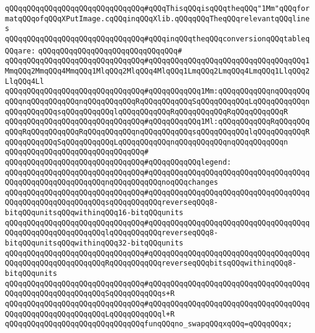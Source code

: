 \verb|qQQqqQQqqQQqqQQqqQQqqQQqqQQqqQQq#qQQqThisqQQqisqQQqtheqQQq"1Mm"qQQqformatqQQqofqQQqXPutImage.cqQQqinqQQqXlib.qQQqqQQqTheqQQqrelevantqQQqlines|\newline
\verb|qQQqqQQqqQQqqQQqqQQqqQQqqQQqqQQq#qQQqinqQQqtheqQQqconversionqQQqtableqQQqare:|\newline
\verb|qQQqqQQqqQQqqQQqqQQqqQQqqQQqqQQq#|\newline
\verb|qQQqqQQqqQQqqQQqqQQqqQQqqQQqqQQq#qQQqqQQqqQQqqQQqqQQqqQQqqQQqqQQqqQQq1MmqQQq2MmqQQq4MmqQQq1MlqQQq2MlqQQq4MlqQQq1LmqQQq2LmqQQq4LmqQQq1LlqQQq2LlqQQq4Ll|\newline
\verb|qQQqqQQqqQQqqQQqqQQqqQQqqQQqqQQq#qQQqqQQqqQQq1Mm:qQQqqQQqqQQqnqQQqqQQqqQQqnqQQqqQQqqQQqnqQQqqQQqqQQqRqQQqqQQqqQQqSqQQqqQQqqQQqLqQQqqQQqqQQqnqQQqqQQqqQQqsqQQqqQQqqQQqlqQQqqQQqqQQqRqQQqqQQqqQQqRqQQqqQQqqQQqR|\newline
\verb|qQQqqQQqqQQqqQQqqQQqqQQqqQQqqQQq#qQQqqQQqqQQq1Ml:qQQqqQQqqQQqRqQQqqQQqqQQqRqQQqqQQqqQQqRqQQqqQQqqQQqnqQQqqQQqqQQqsqQQqqQQqqQQqlqQQqqQQqqQQqRqQQqqQQqqQQqSqQQqqQQqqQQqLqQQqqQQqqQQqnqQQqqQQqqQQqnqQQqqQQqqQQqn|\newline
\verb|qQQqqQQqqQQqqQQqqQQqqQQqqQQqqQQq#|\newline
\verb|qQQqqQQqqQQqqQQqqQQqqQQqqQQqqQQq#qQQqqQQqqQQqlegend:|\newline
\verb|qQQqqQQqqQQqqQQqqQQqqQQqqQQqqQQq#qQQqqQQqqQQqqQQqqQQqqQQqqQQqqQQqqQQqqQQqqQQqqQQqqQQqqQQqqQQqnqQQqqQQqqQQqnoqQQqchanges|\newline
\verb|qQQqqQQqqQQqqQQqqQQqqQQqqQQqqQQq#qQQqqQQqqQQqqQQqqQQqqQQqqQQqqQQqqQQqqQQqqQQqqQQqqQQqqQQqqQQqsqQQqqQQqqQQqreverseqQQq8-bitqQQqunitsqQQqwithinqQQq16-bitqQQqunits|\newline
\verb|qQQqqQQqqQQqqQQqqQQqqQQqqQQqqQQq#qQQqqQQqqQQqqQQqqQQqqQQqqQQqqQQqqQQqqQQqqQQqqQQqqQQqqQQqqQQqlqQQqqQQqqQQqreverseqQQq8-bitqQQqunitsqQQqwithinqQQq32-bitqQQqunits|\newline
\verb|qQQqqQQqqQQqqQQqqQQqqQQqqQQqqQQq#qQQqqQQqqQQqqQQqqQQqqQQqqQQqqQQqqQQqqQQqqQQqqQQqqQQqqQQqqQQqRqQQqqQQqqQQqreverseqQQqbitsqQQqwithinqQQq8-bitqQQqunits|\newline
\verb|qQQqqQQqqQQqqQQqqQQqqQQqqQQqqQQq#qQQqqQQqqQQqqQQqqQQqqQQqqQQqqQQqqQQqqQQqqQQqqQQqqQQqqQQqqQQqSqQQqqQQqqQQqs+R|\newline
\verb|qQQqqQQqqQQqqQQqqQQqqQQqqQQqqQQq#qQQqqQQqqQQqqQQqqQQqqQQqqQQqqQQqqQQqqQQqqQQqqQQqqQQqqQQqqQQqLqQQqqQQqqQQql+R|\newline
\newline
\verb|qQQqqQQqqQQqqQQqqQQqqQQqqQQqqQQqfunqQQqno_swapqQQqxqQQq=qQQqqQQqx;|\newline
